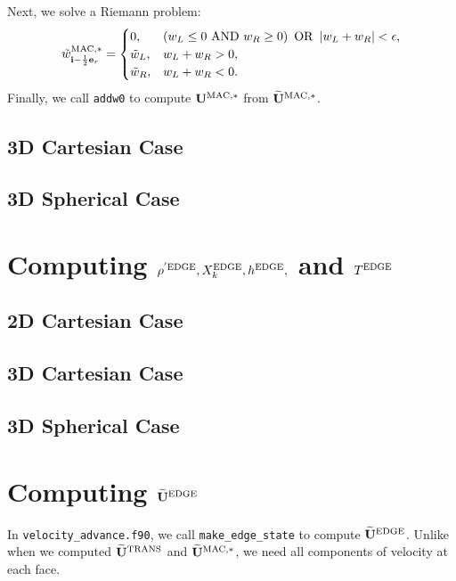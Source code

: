 \documentclass[11pt]{article}
\def\half  {\frac{1}{2}}
\def\edge  {\rm EDGE}
\def\mac   {\rm MAC}
\def\trans {\rm TRANS}
\def\eb    {{\bf e}}
\def\ib    {{\bf i}}
\def\Ub    {{\bf U}}
\def\Ubt   {\widetilde{\bf U}}
\def\wt    {\tilde{w}}
\begin{document}
Next, we solve a Riemann problem:
\begin{equation}
\wt_{\ib-\half\eb_r}^{\mac,*} =
\begin{cases}
0, & \left(w_L \le 0 ~ {\rm AND} ~ w_R \ge 0\right) ~ {\rm OR} ~ \left|w_L + w_R\right| < \epsilon, \\
\wt_L, & w_L + w_R > 0, \\
\wt_R, & w_L + w_R < 0. 
\end{cases}
\end{equation}
Finally, we call {\tt addw0} to compute $\Ub^{\mac,*}$ from $\Ubt^{\mac,*}$.
\subsection{3D Cartesian Case}
\subsection{3D Spherical Case}
\section{Computing $\rho^{'\edge}, X_k^{\edge}, h^{\edge},$ and $T^{\edge}$}
\subsection{2D Cartesian Case}
\subsection{3D Cartesian Case}
\subsection{3D Spherical Case}
\section{Computing $\Ubt^{\edge}$}
In {\tt velocity\_advance.f90}, we call {\tt make\_edge\_state} to compute $\Ubt^{\edge}$.  Unlike when we computed $\Ubt^{\trans}$ and $\Ubt^{\mac,*}$, we need all components of velocity at each face.
\end{document}
